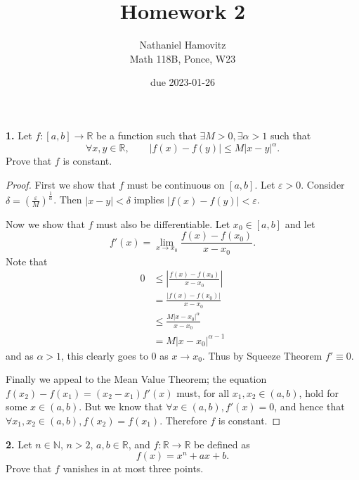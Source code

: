 \documentclass{article}
\newcommand{\R}{\mathbb{R}}
\newcommand{\N}{\mathbb{N}}
\newcommand{\abs}[1]{\left| #1 \right|}
\newcommand{\paren}[1]{\left( #1 \right)}
\newcommand{\problem}[1]{\noindent \textbf{#1}}
\begin{document}


\title{Homework 2} %
\author{Nathaniel Hamovitz\\Math 118B, Ponce, W23}
\date{due 2023-01-26}

\maketitle

\problem{1. } %
Let $f: [a, b] \to \R$ be a function such that $\exists M > 0, \exists \alpha > 1$ such that
$$\forall x, y \in \R, \qquad \abs{f(x) - f(y)} \le M\abs{x - y}^{\alpha}.$$
Prove that $f$ is constant.

\begin{proof}
    First we show that $f$ must be continuous on $[a, b]$. Let $\varepsilon > 0$. Consider $\delta = \paren{\frac{\varepsilon}{M}}^{\frac{1}{\alpha}}$. Then $\abs{x - y} < \delta$ implies $\abs{f(x) - f(y)} < \varepsilon$.

    Now we show that $f$ must also be differentiable. Let $x_0 \in [a, b]$ and let
    $$f'(x) = \lim_{x \to x_0} \frac{f(x) - f(x_0)}{x - x_0}.$$
    Note that
    \begin{align*}
        0 &\le \abs{\frac{f(x) - f(x_0)}{x - x_0}} \\
        &= \frac{\abs{f(x) - f(x_0)}}{x - x_0} \\
        &\le \frac{M\abs{x - x_0}^{\alpha}}{x - x_0} \\
        &= M\abs{x - x_0}^{\alpha - 1}
    \end{align*}
    and as $\alpha > 1$, this clearly goes to $0$ as $x \to x_0$. Thus by Squeeze Theorem $f' \equiv 0$.

    Finally we appeal to the Mean Value Theorem; the equation $f(x_2) - f(x_1) = (x_2 - x_1)f'(x)$ must, for all $x_1, x_2 \in (a, b)$, hold for some $x \in (a, b)$. But we know that $\forall x \in (a, b), f'(x) = 0$, and hence that $\forall x_1, x_2 \in (a, b), f(x_2) = f(x_1)$. Therefore $f$ is constant.    
\end{proof}


\problem{2. } %
Let $n \in \N$, $n > 2$, $a, b \in \R$, and $f: \R \to \R$ be defined as
$$f(x) = x^n + ax + b.$$
Prove that $f$ vanishes in at most three points.
\end{document}
